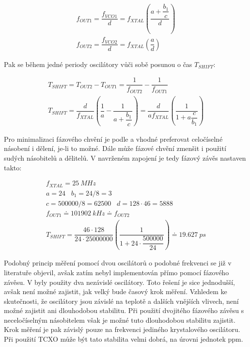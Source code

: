 \begin{equation}
\begin{gathered}
f_{OUT1}=\dfrac{f_{VCO1}}{d}=f_{XTAL} \left(\dfrac{a+\dfrac{b_1}{c} }{d}\right) \\
f_{OUT2}=\dfrac{f_{VCO2}}{d}=f_{XTAL} \left(\dfrac{a}{d}\right)
\end{gathered}
\end{equation}

Pak se během jedné periody oscilátory vůči sobě posunou o čas $T_{SHIFT}$:

\begin{equation}
\begin{gathered}
T_{SHIFT}=T_{OUT2}-T_{OUT1}=\dfrac{1}{f_{OUT2}} - \dfrac{1}{f_{OUT1}} \\
T_{SHIFT}=\dfrac{d}{f_{XTAL}} \left(\dfrac{1}{a} - \dfrac{1}{a+\dfrac{b_1}{c}}\right) = \dfrac{d}{a f_{XTAL}} \left(\dfrac{1}{1+a\dfrac{c}{b_1}}\right)
\end{gathered}
\label{equation_tshift}
\end{equation}

Pro minimalizaci fázového chvění je podle \cite{Si5351datasheet} a \cite{Si5351applicationnote} vhodné preferovat celočíselné násobení i dělení, je-li to možné. Dále může fázové chvění zmenšit i použití sudých násobitelů a dělitelů. V navrženém zapojení je tedy fázový závěs nastaven takto:

\begin{equation}
\begin{gathered}
f_{XTAL}=\SI{25}{MHz} \\
a=24 \;\;\; b_1=24/8=3 \\
c=500000/8=62500 \;\;\; d=128 \cdot 46=5888 \\
f_{OUT1} \doteq \SI{101902}{kHz} \doteq f_{OUT2} \\
T_{SHIFT} = \dfrac{46 \cdot 128}{24 \cdot 25000000} \left(\dfrac{1}{1+24 \cdot \dfrac{500000}{24}}\right) \doteq \SI{19.627}{ps}
\end{gathered}
\end{equation}

Podobný princip měření pomocí dvou oscilátorů o podobné frekvenci se již v literatuře objevil, avšak zatím nebyl implementován přímo pomocí fázového závěsu. V \cite{vernierreflectometer} byly použity dva nezávislé oscilátory. Toto řešení je sice jednodušší, avšak není možné zajistit, jak velký bude časový krok měření. Vzhledem ke skutečnosti, že oscilátory jsou závislé na teplotě a dalších vnějších vlivech, není možné zajistit ani dlouhodobou stabilitu. Při použití dvojitého fázového závěsu s neceločíselným násobitelem však je možné tuto dlouhodobou stabilitu zajistit. Krok měření je pak závislý pouze na frekvenci jediného krystalového oscilátoru. Při použití \acrshort{TCXO} může být tato stabilita velmi dobrá, na úrovni jednotek \si{ppm}.

